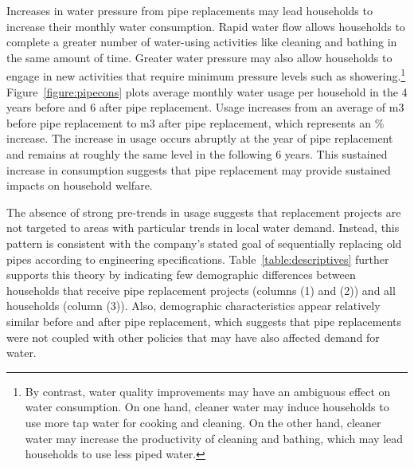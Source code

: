\documentclass[12pt,table]{article}
\begin{document}
Increases in water pressure from pipe replacements may lead households to increase their monthly water consumption.  Rapid water flow allows households to complete a greater number of water-using activities like cleaning and bathing in the same amount of time.  Greater water pressure may also allow households to engage in new activities that require minimum pressure levels such as showering.\footnote{By contrast, water quality improvements may have an ambiguous effect on water consumption.  On one hand, cleaner water may induce households to use more tap water for cooking and cleaning.  On the other hand, cleaner water may increase the productivity of cleaning and bathing, which may lead households to use less piped water.}  Figure~\ref{figure:pipecons} plots average monthly water usage per household in the 4 years before and 6 after pipe replacement.  Usage increases from an average of m3 before pipe replacement to m3 after pipe replacement, which represents an \unskip\% increase.  The increase in usage occurs abruptly at the year of pipe replacement and remains at roughly the same level in the following 6 years.  This sustained increase in consumption suggests that pipe replacement may provide sustained impacts on household welfare.  

The absence of strong pre-trends in usage suggests that replacement projects are not targeted to areas with particular trends in local water demand.  Instead, this pattern is consistent with the company's stated goal of sequentially replacing old pipes according to engineering specifications.  Table~\ref{table:descriptives} further supports this theory by indicating few demographic differences between households that receive pipe replacement projects (columns (1) and (2)) and all households (column (3)).  Also, demographic characteristics appear relatively similar before and after pipe replacement, which suggests that pipe replacements were not coupled with other policies that may have also affected demand for water.  
\end{document}
